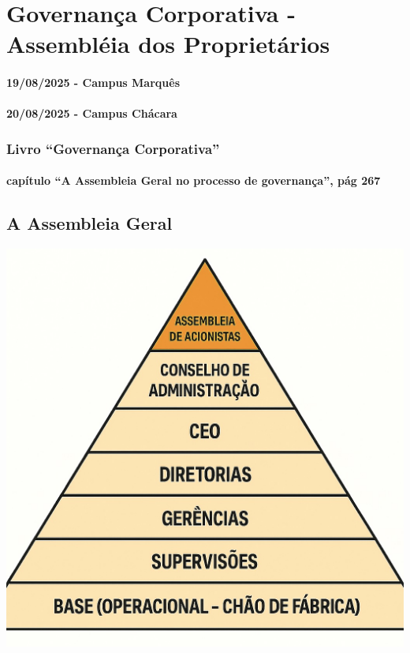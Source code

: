 \documentclass[
]{book}
\begin{document}
\chapter{Governança Corporativa - Assembléia dos Proprietários}\label{governanuxe7a-corporativa---assembluxe9ia-dos-proprietuxe1rios}

\subsubsection*{19/08/2025 - Campus Marquês}\label{campus-marquuxeas-2}

\subsubsection*{20/08/2025 - Campus Chácara}\label{campus-chuxe1cara-2}

\subsection{Livro ``Governança Corporativa''}\label{livro-governanuxe7a-corporativa}

\subsubsection{capítulo ``A Assembleia Geral no processo de governança'', pág 267}\label{capuxedtulo-a-assembleia-geral-no-processo-de-governanuxe7a-puxe1g-267}

\section{\texorpdfstring{\textbf{A Assembleia Geral}}{A Assembleia Geral}}\label{a-assembleia-geral}

\includegraphics[width=5.34375in,height=\textheight]{images/03-2025-08-19_20/00-assembleia_cotistas.jpg}
\end{document}
